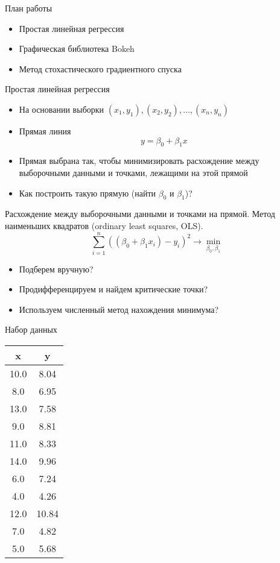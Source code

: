 \documentclass[landscape]{slides}
\begin{document}
\begin{slide}
План работы
\begin{itemize}
\item Простая линейная регрессия
\item Графическая библиотека Bokeh
\item Метод стохастического градиентного спуска
\end{itemize}
\end{slide}

\begin{slide}
Простая линейная регрессия
\begin{itemize}
\item На основании выборки $(x_1, y_1), (x_2, y_2), \ldots, (x_n, y_n)$
\item Прямая линия
$$ y = \beta_0 + \beta_1 x $$
\item Прямая выбрана так, чтобы минимизировать расхождение
между выборочными данными и точками, лежащими на этой прямой
\item Как построить такую прямую (найти $\beta_0$ и $\beta_1$)?
\end{itemize}
\end{slide}


\begin{slide}
Расхождение между выборочными данными и точками на прямой.
Метод наименьших квадратов (ordinary least squares, OLS).
$$ \sum_{i=1}^n ((\beta_0 + \beta_1 x_i) - y_i)^2 \to \min_{\beta_0, \beta_1} $$
\begin{itemize}
\item Подберем вручную?
\item Продифференцируем и найдем критические точки?
\item Используем численный метод нахождения минимума?
\end{itemize}
\end{slide}

\begin{slide}
Набор данных

\begin{tabular}{c|c}
   x & y \\
\hline
10.0 &  8.04 \\
 8.0 &  6.95 \\
13.0 &  7.58 \\
 9.0 &  8.81 \\
11.0 &  8.33 \\
14.0 &  9.96 \\
 6.0 &  7.24 \\
 4.0 &  4.26 \\
12.0 & 10.84 \\
 7.0 &  4.82 \\
 5.0 &  5.68
\end{tabular}
\end{slide}
\end{document}
